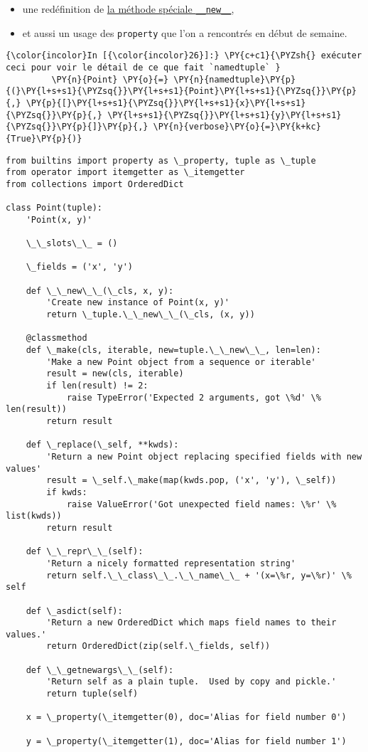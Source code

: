 \begin{itemize}
\item
  une redéfinition de
  \href{https://docs.python.org/3/reference/datamodel.html\#object.__new__}{la
  méthode spéciale \texttt{\_\_new\_\_}},
\item
  et aussi un usage des \texttt{property} que l'on a rencontrés en début
  de semaine.
\end{itemize}

    \begin{Verbatim}[commandchars=\\\{\}]
{\color{incolor}In [{\color{incolor}26}]:} \PY{c+c1}{\PYZsh{} exécuter ceci pour voir le détail de ce que fait `namedtuple` }
         \PY{n}{Point} \PY{o}{=} \PY{n}{namedtuple}\PY{p}{(}\PY{l+s+s1}{\PYZsq{}}\PY{l+s+s1}{Point}\PY{l+s+s1}{\PYZsq{}}\PY{p}{,} \PY{p}{[}\PY{l+s+s1}{\PYZsq{}}\PY{l+s+s1}{x}\PY{l+s+s1}{\PYZsq{}}\PY{p}{,} \PY{l+s+s1}{\PYZsq{}}\PY{l+s+s1}{y}\PY{l+s+s1}{\PYZsq{}}\PY{p}{]}\PY{p}{,} \PY{n}{verbose}\PY{o}{=}\PY{k+kc}{True}\PY{p}{)}
\end{Verbatim}


    \begin{Verbatim}[commandchars=\\\{\}]
from builtins import property as \_property, tuple as \_tuple
from operator import itemgetter as \_itemgetter
from collections import OrderedDict

class Point(tuple):
    'Point(x, y)'

    \_\_slots\_\_ = ()

    \_fields = ('x', 'y')

    def \_\_new\_\_(\_cls, x, y):
        'Create new instance of Point(x, y)'
        return \_tuple.\_\_new\_\_(\_cls, (x, y))

    @classmethod
    def \_make(cls, iterable, new=tuple.\_\_new\_\_, len=len):
        'Make a new Point object from a sequence or iterable'
        result = new(cls, iterable)
        if len(result) != 2:
            raise TypeError('Expected 2 arguments, got \%d' \% len(result))
        return result

    def \_replace(\_self, **kwds):
        'Return a new Point object replacing specified fields with new values'
        result = \_self.\_make(map(kwds.pop, ('x', 'y'), \_self))
        if kwds:
            raise ValueError('Got unexpected field names: \%r' \% list(kwds))
        return result

    def \_\_repr\_\_(self):
        'Return a nicely formatted representation string'
        return self.\_\_class\_\_.\_\_name\_\_ + '(x=\%r, y=\%r)' \% self

    def \_asdict(self):
        'Return a new OrderedDict which maps field names to their values.'
        return OrderedDict(zip(self.\_fields, self))

    def \_\_getnewargs\_\_(self):
        'Return self as a plain tuple.  Used by copy and pickle.'
        return tuple(self)

    x = \_property(\_itemgetter(0), doc='Alias for field number 0')

    y = \_property(\_itemgetter(1), doc='Alias for field number 1')



    \end{Verbatim}